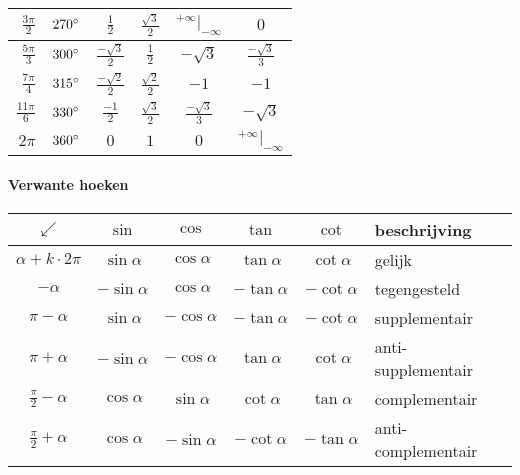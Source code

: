 \begin{center}
\begin{tabular}{|r|r||c|c|c|c|}
	    \hline
	    $\frac{3\pi}{2}$ & $270^\circ$ & $\frac{1}{2}$ & $\frac{\sqrt{3}}{2}$ & $^{+\infty} | _{-\infty}$ & $0$ \\
	    \hline
	    $\frac{5\pi}{3}$ & $300^\circ$ & $\frac{-\sqrt{3}}{2}$ & $\frac{1}{2}$ & $-\sqrt{3}$ & $\frac{-\sqrt{3}}{3}$ \\
	    \hline
	    $\frac{7\pi}{4}$ & $315^\circ$ & $\frac{-\sqrt{2}}{2}$ & $\frac{\sqrt{2}}{2}$ & $-1$ & $-1$ \\
	    \hline
	    $\frac{11\pi}{6}$ & $330^\circ$ & $\frac{-1}{2}$ & $\frac{\sqrt{3}}{2}$ & $\frac{-\sqrt{3}}{3}$ & $-\sqrt{3}$ \\
	    \hline
	    $2\pi$ & $360^\circ$ & $0$ & $1$ & $0$ & $^{+\infty} | _{-\infty}$ \\
	    \hline
	  \end{tabular}	
   \end{center}
   
\paragraph{Verwante hoeken}
\label{sec:VerwanteHoeken}

\begin{center}
	\begin{tabular}{|c||c|c|c|c||l|}
	  \hline
	  $\swarrow$ & $\sin$ & $\cos$ & $\tan$ & $\cot$ & beschrijving\\
	  \hline \hline
	  $\alpha + k\cdot 2\pi $ & $\sin \alpha$ & $\cos \alpha$ & $\tan \alpha$ & $\cot \alpha$ & gelijk\\
	  \hline
	  $- \alpha$ & $-\sin \alpha$ & $\cos \alpha$ & $-\tan \alpha$ & $-\cot \alpha$ & tegengesteld\\
	  \hline
	  $\pi - \alpha$ & $\sin \alpha$ & $-\cos \alpha$ & $-\tan \alpha$ & $-\cot \alpha$ & supplementair\\
	  \hline
	  $\pi + \alpha$ & $-\sin \alpha$ & $-\cos \alpha$ & $\tan \alpha$ & $\cot \alpha$ & anti-supplementair\\
	  \hline
	  $\frac{\pi}{2} - \alpha$ & $\cos \alpha$ & $\sin \alpha$ & $\cot \alpha$ & $\tan \alpha$ & complementair\\
	  \hline
	  $\frac{\pi}{2} + \alpha$ & $\cos \alpha$ & $-\sin \alpha$ & $-\cot \alpha$ & $-\tan \alpha$ & anti-complementair\\
	  \hline 
	\end{tabular}
\end{center}


